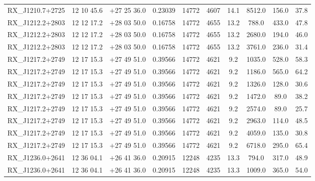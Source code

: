 \begin{landscape}
\begin{center}
\begin{longtable}{l c c c c c c c c c}
RX\_J1210.7+2725  &        12 10 45.6  &         $+$27 25 36.0  &       0.23039  & 14772  &   4607  &       14.1  &      8512.0  &  156.0  &  37.8  \\
RX\_J1212.2+2803  &        12 12 17.2  &         $+$28 03 50.0  &       0.16758  & 14772  &   4655  &       13.2  &      788.0  &   433.0  &  47.8  \\
RX\_J1212.2+2803  &        12 12 17.2  &         $+$28 03 50.0  &       0.16758  & 14772  &   4655  &       13.2  &      2680.0  &  194.0  &  46.0  \\
RX\_J1212.2+2803  &        12 12 17.2  &         $+$28 03 50.0  &       0.16758  & 14772  &   4655  &       13.2  &      3761.0  &  236.0  &  31.4  \\
RX\_J1217.2+2749  &        12 17 15.3  &         $+$27 49 51.0  &       0.39566  & 14772  &   4621  &       9.2  &       1035.0  &  528.0  &  58.3  \\
RX\_J1217.2+2749  &        12 17 15.3  &         $+$27 49 51.0  &       0.39566  & 14772  &   4621  &       9.2  &       1186.0  &  565.0  &  64.2  \\
RX\_J1217.2+2749  &        12 17 15.3  &         $+$27 49 51.0  &       0.39566  & 14772  &   4621  &       9.2  &       1326.0  &  128.0  &  30.6  \\
RX\_J1217.2+2749  &        12 17 15.3  &         $+$27 49 51.0  &       0.39566  & 14772  &   4621  &       9.2  &       1472.0  &  89.0  &   38.2  \\
RX\_J1217.2+2749  &        12 17 15.3  &         $+$27 49 51.0  &       0.39566  & 14772  &   4621  &       9.2  &       2574.0  &  89.0  &   25.7  \\
RX\_J1217.2+2749  &        12 17 15.3  &         $+$27 49 51.0  &       0.39566  & 14772  &   4621  &       9.2  &       2963.0  &  114.0  &  48.5  \\
RX\_J1217.2+2749  &        12 17 15.3  &         $+$27 49 51.0  &       0.39566  & 14772  &   4621  &       9.2  &       4059.0  &  135.0  &  30.8  \\
RX\_J1217.2+2749  &        12 17 15.3  &         $+$27 49 51.0  &       0.39566  & 14772  &   4621  &       9.2  &       6718.0  &  295.0  &  65.4  \\
RX\_J1236.0+2641  &        12 36 04.1  &         $+$26 41 36.0  &       0.20915  & 12248  &   4235  &       13.3  &      794.0  &   317.0  &  48.9  \\
RX\_J1236.0+2641  &        12 36 04.1  &         $+$26 41 36.0  &       0.20915  & 12248  &   4235  &       13.3  &      1009.0  &  365.0  &  54.0  \\

\end{longtable}
\end{center}
\end{landscape}
